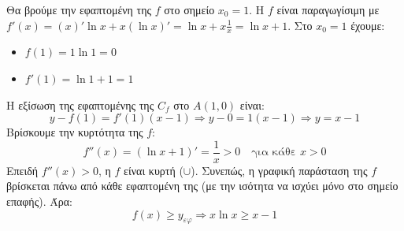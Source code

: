
\lysh
Θα βρούμε την εφαπτομένη της $f$ στο σημείο $x_0 = 1$. 
Η $f$ είναι παραγωγίσιμη με $f'(x) = (x)'\ln x + x(\ln x)' = \ln x + x\frac{1}{x} = \ln x + 1$.
Στο $x_0=1$ έχουμε:
\begin{itemize}
    \item $f(1) = 1\ln 1 = 0$
    \item $f'(1) = \ln 1 + 1 = 1$
\end{itemize}
Η εξίσωση της εφαπτομένης της $C_f$ στο $A(1,0)$ είναι:
\[ y - f(1) = f'(1)(x - 1) \Rightarrow y - 0 = 1(x - 1) \Rightarrow y = x - 1 \]
Βρίσκουμε την κυρτότητα της $f$:
\[ f''(x) = (\ln x + 1)' = \frac{1}{x} > 0 \quad \text{για κάθε } x > 0 \]
Επειδή $f''(x) > 0$, η $f$ είναι κυρτή ($\cup$).
Συνεπώς, η γραφική παράσταση της $f$ βρίσκεται πάνω από κάθε εφαπτομένη της (με την ισότητα να ισχύει μόνο στο σημείο επαφής). Άρα:
\[ f(x) \ge y_{\varepsilon\varphi} \Rightarrow x\ln x \ge x - 1 \]